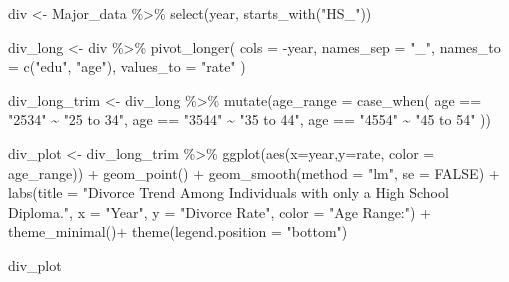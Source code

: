 \documentclass[
]{article}
\newenvironment{Shaded}{\begin{snugshade}}{\end{snugshade}}
\newcommand{\AttributeTok}[1]{\textcolor[rgb]{0.77,0.63,0.00}{#1}}
\newcommand{\ConstantTok}[1]{\textcolor[rgb]{0.00,0.00,0.00}{#1}}
\newcommand{\FunctionTok}[1]{\textcolor[rgb]{0.00,0.00,0.00}{#1}}
\newcommand{\NormalTok}[1]{#1}
\newcommand{\OtherTok}[1]{\textcolor[rgb]{0.56,0.35,0.01}{#1}}
\newcommand{\SpecialCharTok}[1]{\textcolor[rgb]{0.00,0.00,0.00}{#1}}
\newcommand{\StringTok}[1]{\textcolor[rgb]{0.31,0.60,0.02}{#1}}
\begin{document}
\begin{Shaded}
\begin{Highlighting}[]
\NormalTok{div }\OtherTok{\textless{}{-}}\NormalTok{ Major\_data }\SpecialCharTok{\%\textgreater{}\%}
  \FunctionTok{select}\NormalTok{(year, }\FunctionTok{starts\_with}\NormalTok{(}\StringTok{"HS\_"}\NormalTok{)) }

\NormalTok{div\_long }\OtherTok{\textless{}{-}}\NormalTok{ div }\SpecialCharTok{\%\textgreater{}\%} 
  \FunctionTok{pivot\_longer}\NormalTok{(}
  \AttributeTok{cols =} \SpecialCharTok{{-}}\NormalTok{year,}
  \AttributeTok{names\_sep =} \StringTok{"\_"}\NormalTok{,}
  \AttributeTok{names\_to =} \FunctionTok{c}\NormalTok{(}\StringTok{"edu"}\NormalTok{, }\StringTok{"age"}\NormalTok{),}
  \AttributeTok{values\_to =} \StringTok{"rate"}
\NormalTok{)}

\NormalTok{div\_long\_trim }\OtherTok{\textless{}{-}} 
\NormalTok{  div\_long }\SpecialCharTok{\%\textgreater{}\%} 
  \FunctionTok{mutate}\NormalTok{(}\AttributeTok{age\_range =} \FunctionTok{case\_when}\NormalTok{(}
\NormalTok{    age }\SpecialCharTok{==} \StringTok{"2534"} \SpecialCharTok{\textasciitilde{}} \StringTok{"25 to 34"}\NormalTok{,}
\NormalTok{    age }\SpecialCharTok{==} \StringTok{"3544"} \SpecialCharTok{\textasciitilde{}} \StringTok{"35 to 44"}\NormalTok{,}
\NormalTok{    age }\SpecialCharTok{==} \StringTok{"4554"} \SpecialCharTok{\textasciitilde{}} \StringTok{"45 to 54"}
\NormalTok{  ))}

\NormalTok{div\_plot }\OtherTok{\textless{}{-}}\NormalTok{ div\_long\_trim }\SpecialCharTok{\%\textgreater{}\%} 
  \FunctionTok{ggplot}\NormalTok{(}\FunctionTok{aes}\NormalTok{(}\AttributeTok{x=}\NormalTok{year,}\AttributeTok{y=}\NormalTok{rate, }\AttributeTok{color =}\NormalTok{ age\_range)) }\SpecialCharTok{+}
  \FunctionTok{geom\_point}\NormalTok{() }\SpecialCharTok{+}
  \FunctionTok{geom\_smooth}\NormalTok{(}\AttributeTok{method =} \StringTok{"lm"}\NormalTok{, }\AttributeTok{se =} \ConstantTok{FALSE}\NormalTok{) }\SpecialCharTok{+}
  \FunctionTok{labs}\NormalTok{(}\AttributeTok{title =} \StringTok{"Divorce Trend Among Individuals with only a High School Diploma."}\NormalTok{,}
       \AttributeTok{x =} \StringTok{"Year"}\NormalTok{,}
       \AttributeTok{y =} \StringTok{"Divorce Rate"}\NormalTok{,}
       \AttributeTok{color =} \StringTok{"Age Range:"}\NormalTok{) }\SpecialCharTok{+}
   \FunctionTok{theme\_minimal}\NormalTok{()}\SpecialCharTok{+}
  \FunctionTok{theme}\NormalTok{(}\AttributeTok{legend.position =} \StringTok{"bottom"}\NormalTok{)}

\NormalTok{div\_plot}
\end{Highlighting}
\end{Shaded}
\end{document}
